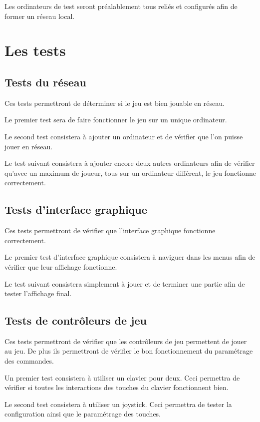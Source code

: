 Les ordinateurs de test seront préalablement tous reliés et configurés afin de former un réseau local.


\section{Les tests}

\subsection{Tests du réseau}

Ces tests permettront de déterminer si le jeu est bien jouable en réseau.

Le premier test sera de faire fonctionner le jeu sur un unique ordinateur.

Le second test consistera à ajouter un ordinateur et de vérifier que l'on puisse jouer en réseau.

Le test suivant consistera à ajouter encore deux autres ordinateurs afin de vérifier qu'avec un maximum de joueur, tous sur un ordinateur différent, le jeu fonctionne correctement.

\subsection{Tests d'interface graphique}

Ces tests permettront de vérifier que l'interface graphique fonctionne correctement.

Le premier test d'interface graphique consistera à naviguer dans les menus afin de vérifier que leur affichage fonctionne.

Le test suivant consistera simplement à jouer et de terminer une partie afin de tester l'affichage final.

\subsection{Tests de contrôleurs de jeu}

Ces tests permettront de vérifier que les contrôleurs de jeu permettent de jouer au jeu. De plus ils permettront de vérifier le bon fonctionnement du paramétrage des commandes.

Un premier test consistera à utiliser un clavier pour deux. Ceci permettra de vérifier si toutes les interactions des touches du clavier fonctionnent bien.

Le second test consistera à utiliser un joystick. Ceci permettra de tester la configuration ainsi que le paramétrage des touches.


